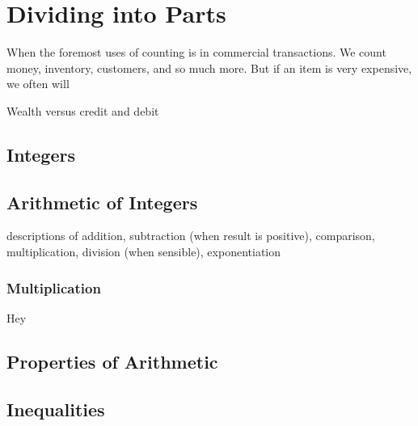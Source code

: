 \chapter{Dividing into Parts}

 When the foremost uses of counting is in commercial transactions. We count money, inventory, customers, and so much more. But if an item is very expensive, we often will 

Wealth versus credit and debit


\section{Integers}

\section{Arithmetic of Integers}

descriptions of addition, subtraction (when result is positive), comparison, multiplication, division (when sensible), exponentiation

\subsection{Multiplication}

Hey 

\section{Properties of Arithmetic}

\section{Inequalities}


